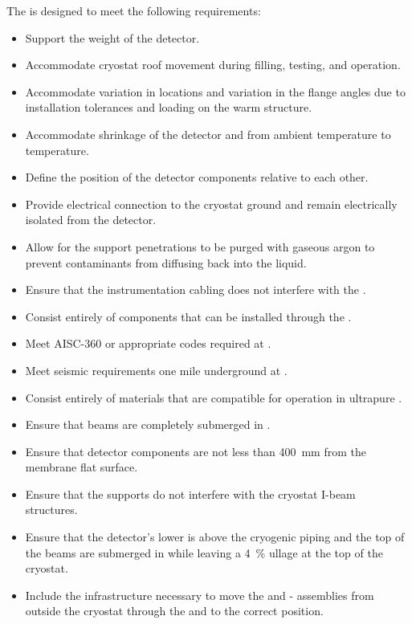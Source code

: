 The  is designed to meet the following  requirements:
\begin{itemize}
 \setlength\itemsep{1mm}
\setlength{\parsep}{1mm}
\setlength{\itemsep}{-5mm}
\item Support the weight of the detector.
\item Accommodate cryostat roof movement during filling, testing, and operation.
\item Accommodate variation in \fdth locations and
  variation in the flange angles due to installation tolerances and
  loading on the warm structure.
\item Accommodate shrinkage of the detector and  from ambient
  temperature to  temperature.
\item Define the position of the detector components relative to each other. 
\item Provide electrical connection to the cryostat ground and remain electrically isolated from the detector.
\item Allow for the support penetrations to be purged with gaseous argon to prevent contaminants from diffusing back into the liquid. 
\item Ensure that the instrumentation cabling does not interfere with the .
\item Consist entirely of components that can  
be installed through the .
\item %
Meet AISC-360 or appropriate codes required at \surf.
\item %
Meet seismic requirements one mile underground at \surf.
\item Consist entirely of %
materials that are compatible for operation in ultrapure .
\item Ensure that beams are completely submerged in .
\item Ensure that detector components are not less than \SI{400}{mm} from the membrane flat surface.
\item Ensure that the supports do not interfere with the cryostat I-beam structures.
\item Ensure %
that the detector's lower  is above the cryogenic piping and the top of the  beams are submerged in  while leaving a \SI{4}{\%} ullage at the top of the cryostat.
\item Include the infrastructure necessary to move the  and
  - assemblies from outside the cryostat through the
   and to the correct position.
\end{itemize}

